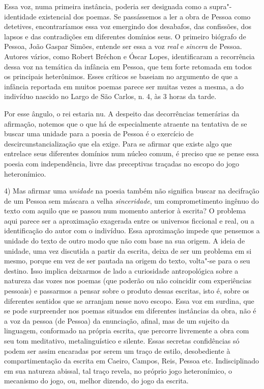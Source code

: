 Essa voz, numa primeira instância, poderia ser designada como a
supra"-identidade existencial dos poemas. Se passássemos a ler a obra de
Pessoa como detetives, encontraríamos essa voz emergindo dos desabafos,
das confissões, dos lapsos e das contradições em diferentes domínios
seus. O primeiro biógrafo de Pessoa, João Gaspar Simões, entende ser
essa a voz \emph{real} e \emph{sincera} de Pessoa. Autores vários, como
Robert Bréchon e Óscar Lopes, identificaram a recorrência dessa voz na
temática da infância em Pessoa, que tem forte retomada em todos os
principais heterônimos. Esses críticos se baseiam no argumento de que a
infância reportada em muitos poemas parece ser muitas vezes a mesma, a
do indivíduo nascido no Largo de São Carlos, n. 4, às 3 horas da tarde.

Por esse ângulo, o rei estaria nu. A despeito das decorrências
temerárias da afirmação, notemos que o que há de especialmente atraente
na tentativa de se buscar uma unidade para a poesia de Pessoa é o
exercício de descircunstancialização que ela exige. Para se afirmar que
existe algo que entrelace seus diferentes domínios num núcleo comum, é
preciso que se pense essa poesia com independência, livre das
preceptivas traçadas no escopo do jogo heteronímico.

4) Mas afirmar uma \emph{unidade} na poesia também não significa buscar
na decifração de um Pessoa sem máscara a velha \emph{sinceridade}, um
comprometimento ingênuo do texto com aquilo que se passou num momento
anterior à escrita? O problema aqui parece ser a aproximação exagerada
entre os universos ficcional e real, ou a identificação do autor com o
indivíduo. Essa aproximação impede que pensemos a unidade do texto de
outro modo que não com base na sua origem. A ideia de unidade, uma vez
discutida a partir da escrita, deixa de ser um problema em si mesmo,
porque em vez de ser pautada na origem do texto, volta"-se para o seu
destino. Isso implica deixarmos de lado a curiosidade antropológica
sobre a natureza das vozes nos poemas (que poderão ou não coincidir com
experiências pessoais) e passarmos a pensar sobre o produto dessas
escritas, isto é, sobre os diferentes sentidos que se arranjam nesse
novo escopo. Essa voz em surdina, que se pode surpreender nos poemas
situados em diferentes instâncias da obra, não é a voz da pessoa (de
Pessoa) da enunciação, afinal, mas de um sujeito da linguagem,
conformado na própria escrita, que percorre livremente a obra com seu
tom meditativo, metalinguístico e silente. Essas secretas confidências
só podem ser assim encaradas por serem um traço de estilo, desobediente
à compartimentação da escrita em Caeiro, Campos, Reis, Pessoa etc.
Indisciplinado em sua natureza abissal, tal traço revela, no próprio
jogo heteronímico, o mecanismo do jogo, ou, melhor dizendo, do jogo da
escrita.

